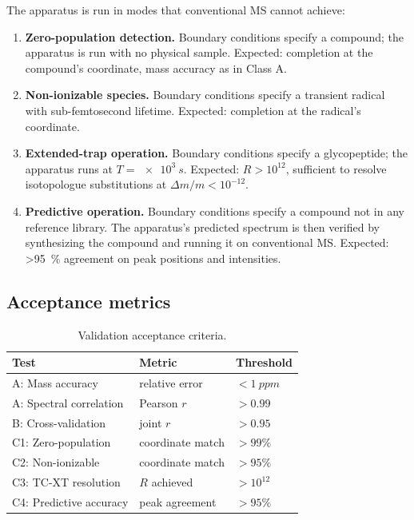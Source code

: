 \documentclass[twocolumn,11pt,a4paper]{article}
\theoremstyle{definition}
\theoremstyle{remark}
\begin{document}
The apparatus is run in modes that conventional MS cannot achieve:

\begin{enumerate}[nosep]
    \item \textbf{Zero-population detection.} Boundary conditions specify a compound; the apparatus is run with no physical sample. Expected: completion at the compound's coordinate, mass accuracy as in Class A.
    \item \textbf{Non-ionizable species.} Boundary conditions specify a transient radical with sub-femtosecond lifetime. Expected: completion at the radical's coordinate.
    \item \textbf{Extended-trap operation.} Boundary conditions specify a glycopeptide; the apparatus runs at $T = \SI{e3}{s}$. Expected: $R > 10^{12}$, sufficient to resolve isotopologue substitutions at $\Delta m / m < 10^{-12}$.
    \item \textbf{Predictive operation.} Boundary conditions specify a compound not in any reference library. The apparatus's predicted spectrum is then verified by synthesizing the compound and running it on conventional MS. Expected: \SI{>95}{\percent} agreement on peak positions and intensities.
\end{enumerate}

\subsection{Acceptance metrics}

\begin{table}[H]
\centering
\caption{Validation acceptance criteria.}
\label{tab:validation}
\small
\begin{tabular}{lll}
\toprule
\textbf{Test} & \textbf{Metric} & \textbf{Threshold} \\
\midrule
A: Mass accuracy & relative error & $< \SI{1}{ppm}$ \\
A: Spectral correlation & Pearson $r$ & $> 0.99$ \\
B: Cross-validation & joint $r$ & $> 0.95$ \\
C1: Zero-population & coordinate match & $> 99\%$ \\
C2: Non-ionizable & coordinate match & $> 95\%$ \\
C3: TC-XT resolution & $R$ achieved & $> 10^{12}$ \\
C4: Predictive accuracy & peak agreement & $> 95\%$ \\
\bottomrule
\end{tabular}
\end{table}
\end{document}
